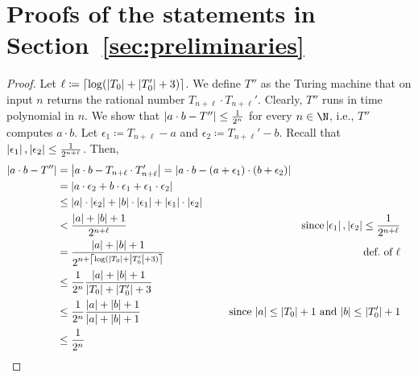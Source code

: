 \section{Proofs of the statements in Section~\ref{sec:preliminaries}}
\label{appendix:preliminaries}

\LemmaTuringMachineProducts*

\begin{proof}
Let $\ell \coloneqq \left\lceil\log(\left|T_0\right|+\left|T_0'\right|+3)\right\rceil$.
We define $T''$ as the Turing machine that on input $n$ returns the 
rational number $T_{n+\ell} \cdot T_{n+\ell}'$. 
Clearly, $T''$ runs in time polynomial in $n$.
We show that $\left|a \cdot b - T''\right| \leq \frac{1}{2^n}$ for every $n \in \N$, 
i.e., $T''$ computes $a \cdot b$. 
Let $\epsilon_1 \coloneqq T_{n+\ell}-a$ and $\epsilon_2 \coloneqq T_{n+\ell}'-b$. Recall that $\left|\epsilon_1\right|,\left|\epsilon_2\right| \leq \frac{1}{2^{n+\ell}}$. 
Then, 
\begin{align*}
  \abs{a \cdot b - T''} &=
  \abs{a \cdot b - T_{n+\ell} \cdot T_{n+\ell}'} =
  \abs{a \cdot b - (a+\epsilon_1) \cdot (b+\epsilon_2)}\\
  &=\abs{a \cdot \epsilon_2 + b \cdot \epsilon_1 + \epsilon_1 \cdot \epsilon_2}\\
  &\leq \abs{a} \cdot \abs{\epsilon_2} + \abs{b} \cdot \abs{\epsilon_1} + \abs{\epsilon_1} \cdot \abs{\epsilon_2}\\
  &< \frac{\abs{a}+\abs{b}+1}{2^{n+\ell}}
  &\text{since} \abs{\epsilon_1},\abs{\epsilon_2} \leq \frac{1}{2^{n+\ell}}\\
  &= \frac{\abs{a}+\abs{b}+1}{2^{n+\ceil{\log(\abs{T_0}+\abs{T_0'}+3)}}}
  &\text{def.~of~$\ell$}\\
  &\leq \frac{1}{2^{n}}\frac{\abs{a}+\abs{b}+1}{\abs{T_0}+\abs{T_0'}+3}\\
  &\leq \frac{1}{2^{n}}\frac{\abs{a}+\abs{b}+1}{\abs{a}+\abs{b}+1}
  &\hspace{-2.4cm}\text{since $\abs{a} \leq \abs{T_0}+1$ and $\abs{b} \leq \abs{T_0'}+1$}\\
  &\leq \frac{1}{2^n}
  &&\qedhere
\end{align*}
\end{proof}

\LemmaTuringMachineReciprocal* 


